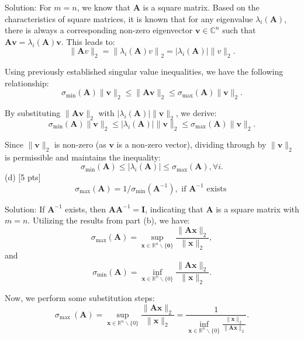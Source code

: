 \documentclass{article}
\begin{document}
Solution:
For $m=n$, we know that $\boldsymbol{A}$ is a square matrix. Based on the characteristics of square matrices, it is known that for any eigenvalue $\lambda_i(\boldsymbol{A})$, there is always a corresponding non-zero eigenvector $\boldsymbol{v} \in \mathbb{C}^n$ such that $\boldsymbol{A} \boldsymbol{v}=\lambda_i(\boldsymbol{A}) \boldsymbol{v}$. This leads to:
$$
\|\boldsymbol{A} v\|_2=\left\|\lambda_i(\boldsymbol{A}) v\right\|_2=\left|\lambda_i(\boldsymbol{A})\right|\|v\|_2 .
$$

Using previously established singular value inequalities, we have the following relationship:
$$
\sigma_{\min }(\boldsymbol{A})\|\boldsymbol{v}\|_2 \leq\|\boldsymbol{A} \boldsymbol{v}\|_2 \leq \sigma_{\max }(\boldsymbol{A})\|\boldsymbol{v}\|_2 .
$$

By substituting $\|\boldsymbol{A} \boldsymbol{v}\|_2$ with $\left|\lambda_i(\boldsymbol{A})\right|\|\boldsymbol{v}\|_2$, we derive:
$$
\sigma_{\min }(\boldsymbol{A})\|\boldsymbol{v}\|_2 \leq\left|\lambda_i(\boldsymbol{A})\right|\|\boldsymbol{v}\|_2 \leq \sigma_{\max }(\boldsymbol{A})\|\boldsymbol{v}\|_2 .
$$

Since $\|\boldsymbol{v}\|_2$ is non-zero (as $\boldsymbol{v}$ is a non-zero vector), dividing through by $\|\boldsymbol{v}\|_2$ is permissible and maintains the inequality:
$$
\sigma_{\min }(\boldsymbol{A}) \leq\left|\lambda_i(\boldsymbol{A})\right| \leq \sigma_{\max }(\boldsymbol{A}), \forall i .
$$
(d) [5 pts]
$$
\sigma_{\max }(\boldsymbol{A})=1 / \sigma_{\min }\left(\boldsymbol{A}^{-1}\right), \text { if } \boldsymbol{A}^{-1} \text { exists }
$$

Solution:
If $\boldsymbol{A}^{-1}$ exists, then $\boldsymbol{A} \boldsymbol{A}^{-1}=\boldsymbol{I}$, indicating that $\boldsymbol{A}$ is a square matrix with $m=n$.
Utilizing the results from part (b), we have:
$$
\sigma_{\max }(\boldsymbol{A})=\sup _{\boldsymbol{x} \in \mathbb{R}^n \backslash\{\mathbf{0}\}} \frac{\|\boldsymbol{A} \boldsymbol{x}\|_2}{\|\boldsymbol{x}\|_2},
$$and
$$
\sigma_{\min }(\boldsymbol{A})=\inf _{\boldsymbol{x} \in \mathbb{R}^n \backslash\{0\}} \frac{\|\boldsymbol{A} \boldsymbol{x}\|_2}{\|\boldsymbol{x}\|_2} .
$$

Now, we perform some substitution steps:
$$
\sigma_{\text {max }}(\boldsymbol{A})=\sup _{\boldsymbol{x} \in \mathbb{R}^n \backslash\{0\}} \frac{\|\boldsymbol{A} \boldsymbol{x}\|_2}{\|\boldsymbol{x}\|_2}=\frac{1}{\inf _{\boldsymbol{x} \in \mathbb{R}^n \backslash\{0\}} \frac{\|\boldsymbol{x}\|_2}{\|\boldsymbol{A} \boldsymbol{x}\|_2}} .
$$
\end{document}
